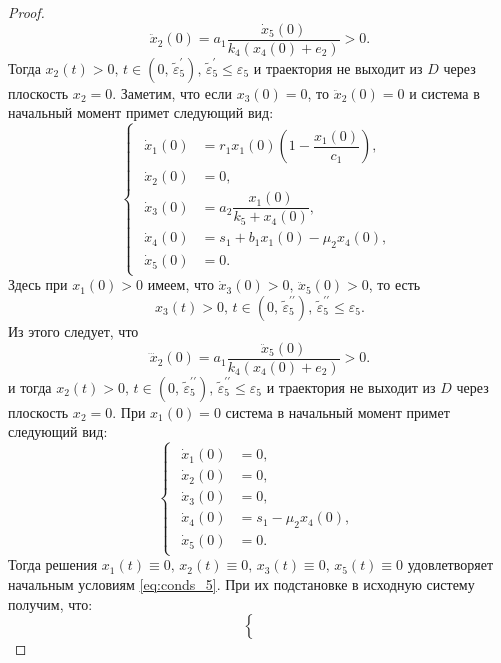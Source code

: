 \documentclass[14pt,a4paper]{extarticle}
\begin{document}
\begin{proof}
		\[\ddot{x}_2(0) = a_1\dfrac{\dot{x}_5(0)}{k_4(x_4(0)+e_2)} > 0.\]
		Тогда $x_2(t)>0,\, t\in(0,\, \tilde{\varepsilon}^{\prime}_5),\,\tilde{\varepsilon}^{\prime}_5\le\varepsilon_5$ и траектория не выходит из $D$ через плоскость $x_2=0$. Заметим, что если $x_3(0)=0$, то
		 $\ddot{x}_2(0)=0$ и система в начальный момент примет следующий вид:
		\begin{equation*}
			\begin{cases}
				\begin{aligned}
					\dot{x}_1(0) &= r_1x_1(0)\left(1-\dfrac{x_1(0)}{c_1}\right),\\
					\dot{x}_2(0) &= 0,\\
					\dot{x}_3(0) &= a_2\dfrac{x_1(0)}{k_5+x_4(0)},\\
					\dot{x}_4(0) &= s_1 + b_1x_1(0)-\mu_2x_4(0),\\
					\dot{x}_5(0) &= 0.
				\end{aligned}
			\end{cases}
		\end{equation*} 
		Здесь при $x_1(0)>0$ имеем, что $\dot{x}_3(0)>0,\,\ddot{x}_5(0)>0$, то есть 
		\[x_3(t)>0,\, t\in(0,\, \tilde{\varepsilon}^{\prime\prime}_5),\,\tilde{\varepsilon}^{\prime\prime}_5\le\varepsilon_5.\]
		Из этого следует, что
		\[\dddot{x}_2(0) = a_1\dfrac{\ddot{x}_5(0)}{k_4(x_4(0)+e_2)}>0.\]
		и тогда $x_2(t)>0,\, t\in(0,\, \tilde{\varepsilon}^{\prime\prime}_5),\,\tilde{\varepsilon}^{\prime\prime}_5\le\varepsilon_5$ и траектория не выходит из $D$ через плоскость $x_2=0$. При $x_1(0)=0$ система в начальный момент примет следующий вид:
		\begin{equation*}
			\begin{cases}
				\begin{aligned}
					\dot{x}_1(0) &= 0,\\
					\dot{x}_2(0) &= 0,\\
					\dot{x}_3(0) &= 0,\\
					\dot{x}_4(0) &= s_1 - \mu_2x_4(0),\\
					\dot{x}_5(0) &= 0.
				\end{aligned}
			\end{cases}
		\end{equation*}
		Тогда решения $x_1(t)\equiv0,\, x_2(t)\equiv0,\, x_3(t)\equiv0,\, x_5(t)\equiv0$ удовлетворяет начальным условиям \ref{eq:conds_5}. 
		При их подстановке в исходную систему получим, что:
		\begin{equation*}
			\begin{cases}
				\begin{aligned}

\end{aligned}
\end{cases}
\end{equation*}
\end{proof}
\end{document}
